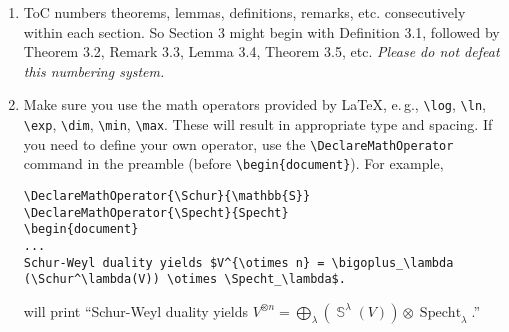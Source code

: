 \documentclass{article}
\newcommand{\eg}{e.\,g.}
\theoremstyle{plain}
\newcommand{\expref}[2]{\texorpdfstring{\hyperref[#2]{#1~\ref{#2}}}{#1~\ref{#2}}}
\DeclareMathOperator{\Schur}{\mathbb{S}}
\DeclareMathOperator{\Specht}{Specht}
\theoremstyle{definition}
\begin{document}
\begin{enumerate}
In the case where a proof is not adjacent with the theorem it
supports, indicate this with the optional argument as below:
\begin{lstlisting}
\begin{proof}[Proof of \expref{Theorem}{thm:Markov}.]
  To prove inequality~\eqref{markov.eq}, expand the definition of
$E[X]$.
\end{proof}
\end{lstlisting}
This produces the typeset output:
\begin{proof}[Proof of \expref{Theorem}{thm:Markov}.]
  To prove inequality~\eqref{markov.eq}, expand the definition of
$E[X]$.
\end{proof}
See \expref{Section}{sec:math} for further details.
\item ToC numbers theorems, lemmas, definitions, remarks, etc.
  consecutively within each section.  So Section 3 might begin with
  Definition 3.1, followed by Theorem 3.2, Remark 3.3, Lemma 3.4,
  Theorem 3.5, etc.  \emph{Please do not defeat this numbering system.}
\item Make sure you use the math operators provided by LaTeX, \eg,
  \lstinline.\log., \lstinline$\ln$, \lstinline$\exp$, \lstinline$\dim$, \lstinline$\min$,
  \lstinline$\max$. These will result in appropriate type and spacing.
 If you need to define your own operator, use the
\lstinline$\DeclareMathOperator$
command in the preamble (before \lstinline$\begin{document}$).
For example,
\begin{lstlisting}
\DeclareMathOperator{\Schur}{\mathbb{S}}
\DeclareMathOperator{\Specht}{Specht}
\begin{document}
...
Schur-Weyl duality yields $V^{\otimes n} = \bigoplus_\lambda
(\Schur^\lambda(V)) \otimes \Specht_\lambda$.
\end{lstlisting}
will print ``Schur-Weyl duality yields $V^{\otimes n} = \bigoplus_\lambda
(\Schur^\lambda(V)) \otimes \Specht_\lambda$.''


\end{enumerate}
\end{document}
